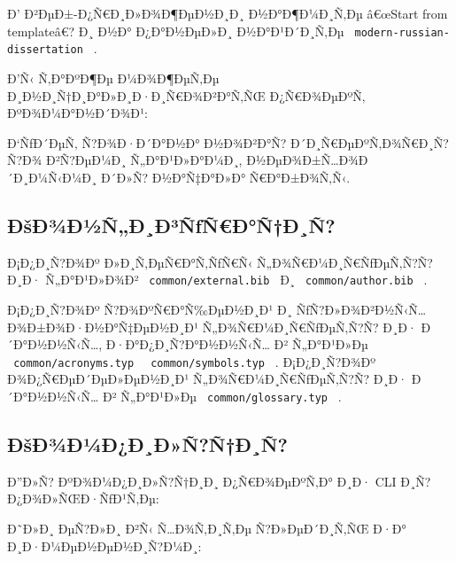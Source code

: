 Ð' Ð²ÐµÐ±-Ð¿Ñ€Ð¸Ð»Ð¾Ð¶ÐµÐ½Ð¸Ð¸ Ð½Ð°Ð¶Ð¼Ð¸Ñ‚Ðµ â€œStart from templateâ€?
Ð¸ Ð½Ð° Ð¿Ð°Ð½ÐµÐ»Ð¸ Ð½Ð°Ð¹Ð´Ð¸Ñ‚Ðµ
\texttt{\ modern-russian-dissertation\ } .

Ð'Ñ‹ Ñ‚Ð°ÐºÐ¶Ðµ Ð¼Ð¾Ð¶ÐµÑ‚Ðµ Ð¸Ð½Ð¸Ñ†Ð¸Ð°Ð»Ð¸Ð·Ð¸Ñ€Ð¾Ð²Ð°Ñ‚ÑŒ
Ð¿Ñ€Ð¾ÐµÐºÑ‚ ÐºÐ¾Ð¼Ð°Ð½Ð´Ð¾Ð¹:

\begin{Shaded}
\begin{Highlighting}[]
\end{Highlighting}
\end{Shaded}

Ð`ÑƒÐ´ÐµÑ‚ Ñ?Ð¾Ð·Ð´Ð°Ð½Ð° Ð½Ð¾Ð²Ð°Ñ? Ð´Ð¸Ñ€ÐµÐºÑ‚Ð¾Ñ€Ð¸Ñ? Ñ?Ð¾
Ð²Ñ?ÐµÐ¼Ð¸ Ñ„Ð°Ð¹Ð»Ð°Ð¼Ð¸, Ð½ÐµÐ¾Ð±Ñ\ldots Ð¾Ð´Ð¸Ð¼Ñ‹Ð¼Ð¸ Ð´Ð»Ñ?
Ð½Ð°Ñ‡Ð°Ð»Ð° Ñ€Ð°Ð±Ð¾Ñ‚Ñ‹.

\subsection{ÐšÐ¾Ð½Ñ„Ð¸Ð³ÑƒÑ€Ð°Ñ†Ð¸Ñ?}\label{uxf0ux161uxf0uxbeuxf0uxbduxf1uxf0uxf0uxb3uxf1ux192uxf1uxf0uxf1uxf0uxf1}

Ð¡Ð¿Ð¸Ñ?Ð¾Ðº Ð»Ð¸Ñ‚ÐµÑ€Ð°Ñ‚ÑƒÑ€Ñ‹ Ñ„Ð¾Ñ€Ð¼Ð¸Ñ€ÑƒÐµÑ‚Ñ?Ñ? Ð¸Ð·
Ñ„Ð°Ð¹Ð»Ð¾Ð² \texttt{\ common/external.bib\ } Ð¸
\texttt{\ common/author.bib\ } .

Ð¡Ð¿Ð¸Ñ?Ð¾Ðº Ñ?Ð¾ÐºÑ€Ð°Ñ‰ÐµÐ½Ð¸Ð¹ Ð¸ ÑƒÑ?Ð»Ð¾Ð²Ð½Ñ‹Ñ\ldots{}
Ð¾Ð±Ð¾Ð·Ð½Ð°Ñ‡ÐµÐ½Ð¸Ð¹ Ñ„Ð¾Ñ€Ð¼Ð¸Ñ€ÑƒÐµÑ‚Ñ?Ñ? Ð¸Ð· Ð´Ð°Ð½Ð½Ñ‹Ñ\ldots,
Ð·Ð°Ð¿Ð¸Ñ?Ð°Ð½Ð½Ñ‹Ñ\ldots{} Ð² Ñ„Ð°Ð¹Ð»Ðµ
\texttt{\ common/acronyms.typ\ } \texttt{\ common/symbols.typ\ } .
Ð¡Ð¿Ð¸Ñ?Ð¾Ðº Ð¾Ð¿Ñ€ÐµÐ´ÐµÐ»ÐµÐ½Ð¸Ð¹ Ñ„Ð¾Ñ€Ð¼Ð¸Ñ€ÑƒÐµÑ‚Ñ?Ñ? Ð¸Ð·
Ð´Ð°Ð½Ð½Ñ‹Ñ\ldots{} Ð² Ñ„Ð°Ð¹Ð»Ðµ \texttt{\ common/glossary.typ\ } .

\subsection{ÐšÐ¾Ð¼Ð¿Ð¸Ð»Ñ?Ñ†Ð¸Ñ?}\label{uxf0ux161uxf0uxbeuxf0uxbcuxf0uxf0uxf0uxf1uxf1uxf0uxf1}

Ð''Ð»Ñ? ÐºÐ¾Ð¼Ð¿Ð¸Ð»Ñ?Ñ†Ð¸Ð¸ Ð¿Ñ€Ð¾ÐµÐºÑ‚Ð° Ð¸Ð· CLI
Ð¸Ñ?Ð¿Ð¾Ð»ÑŒÐ·ÑƒÐ¹Ñ‚Ðµ:

\begin{Shaded}
\begin{Highlighting}[]
\end{Highlighting}
\end{Shaded}

Ð˜Ð»Ð¸ ÐµÑ?Ð»Ð¸ Ð²Ñ‹ Ñ\ldots Ð¾Ñ‚Ð¸Ñ‚Ðµ Ñ?Ð»ÐµÐ´Ð¸Ñ‚ÑŒ Ð·Ð°
Ð¸Ð·Ð¼ÐµÐ½ÐµÐ½Ð¸Ñ?Ð¼Ð¸:

